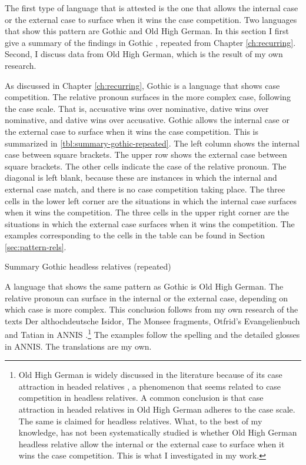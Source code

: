 The first type of language that is attested is the one that allows the internal case or the external case to surface when it wins the case competition. Two languages that show this pattern are Gothic and Old High German. In this section I first give a summary of the findings in Gothic \citep{harbert1978}, repeated from Chapter \ref{ch:recurring}. Second, I discuss data from Old High German, which is the result of my own research.

As discussed in Chapter \ref{ch:recurring}, Gothic is a language that shows case competition. The relative pronoun surfaces in the more complex case, following the case scale. That is, accusative wins over nominative, dative wins over nominative, and dative wins over accusative.
Gothic allows the internal case or the external case to surface when it wins the case competition. This is summarized in \ref{tbl:summary-gothic-repeated}. The left column shows the internal case between square brackets. The upper row shows the external case between square brackets. The other cells indicate the case of the relative pronoun. The diagonal is left blank, because these are instances in which the internal and external case match, and there is no case competition taking place.
The three cells in the lower left corner are the situations in which the internal case surfaces when it wins the competition. The three cells in the upper right corner are the situations in which the external case surfaces when it wins the competition.
The examples corresponding to the cells in the table can be found in Section \ref{sec:pattern-rels}.

\begin{table}[H]
  \center
  \caption{Summary Gothic headless relatives (repeated)}
    
    \label{tbl:summary-gothic-repeated}
\end{table}

A language that shows the same pattern as Gothic is Old High German. The relative pronoun can surface in the internal or the external case, depending on which case is more complex. This conclusion follows from my own research of the texts Der althochdeutsche Isidor, The Monsee fragments, Otfrid's Evangelienbuch and Tatian in ANNIS \citep{krause2016}.\footnote{
Old High German is widely discussed in the literature because of its case attraction in headed relatives \citep[cf.][]{pittner1995}, a phenomenon that seems related to case competition in headless relatives. A common conclusion is that case attraction in headed relatives in Old High German adheres to the case scale. The same is claimed for headless relatives.
What, to the best of my knowledge, has not been systematically studied is whether Old High German headless relative allow the internal or the external case to surface when it wins the case competition. This is what I investigated in my work.
}
The examples follow the spelling and the detailed glosses in ANNIS. The translations are my own.

